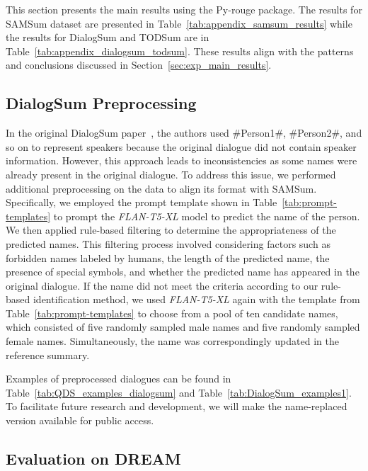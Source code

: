 \documentclass[11pt]{article}
\begin{document}
        This section presents the main results using the Py-rouge package. The results for SAMSum dataset are presented in Table~\ref{tab:appendix_samsum_results} while the results for DialogSum and TODSum are in Table~\ref{tab:appendix_dialogsum_todsum}. These results align with the patterns and conclusions discussed in Section~\ref{sec:exp_main_results}.

    \subsection{DialogSum Preprocessing}
    \label{sec:appendix_dialoguesum_preprocessing}


        In the original DialogSum paper~\cite{chen-etal-2021-dialogsum}, the authors used \#Person1\#, \#Person2\#, and so on to represent speakers because the original dialogue did not contain speaker information. However, this approach leads to inconsistencies as some names were already present in the original dialogue. To address this issue, we performed additional preprocessing on the data to align its format with SAMSum. Specifically, we employed the prompt template shown in Table~\ref{tab:prompt-templates} to prompt the \emph{FLAN-T5-XL} model to predict the name of the person. We then applied rule-based filtering to determine the appropriateness of the predicted names. This filtering process involved considering factors such as forbidden names labeled by humans, the length of the predicted name, the presence of special symbols, and whether the predicted name has appeared in the original dialogue. If the name did not meet the criteria according to our rule-based identification method, we used \emph{FLAN-T5-XL} again with the template from Table~\ref{tab:prompt-templates} to choose from a pool of ten candidate names, which consisted of five randomly sampled male names and five randomly sampled female names. Simultaneously, the name was correspondingly updated in the reference summary.


        Examples of preprocessed dialogues can be found in Table~\ref{tab:QDS_examples_dialogsum} and Table~\ref{tab:DialogSum_examples1}. To facilitate future research and development, we will make the name-replaced version available for public access.
        

    \subsection{Evaluation on DREAM}
    \label{appendix:dream_eval}
\end{document}
